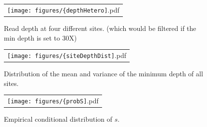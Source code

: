 \documentclass[11pt]{article}
\begin{document}
\begin{figure}[H]
	\centering
	\begin{tabular}{c}
		\texttt{[image: figures/\{depthHetero]}.pdf}
	\end{tabular}
	\caption{Read depth at four different sites. (which would be filtered if the min depth is set to 30X)} 
	\label{fig:depthHetero}
\end{figure}

\begin{figure}[H]
	\centering
	\begin{tabular}{c}
		\texttt{[image: figures/\{siteDepthDist]}.pdf}\\
	\end{tabular}
	\caption{Distribution of the mean and variance of the minimum depth of all sites.} 
	\label{fig:siteDepthDist}
\end{figure}
\begin{figure}[H]
	\centering
	\begin{tabular}{c}
		\texttt{[image: figures/\{probS]}.pdf}\\
	\end{tabular}
	\caption{Empirical conditional distribution of $s$.} 
	\label{fig:probS}
\end{figure}
\newpage


\newpage

\end{document}
